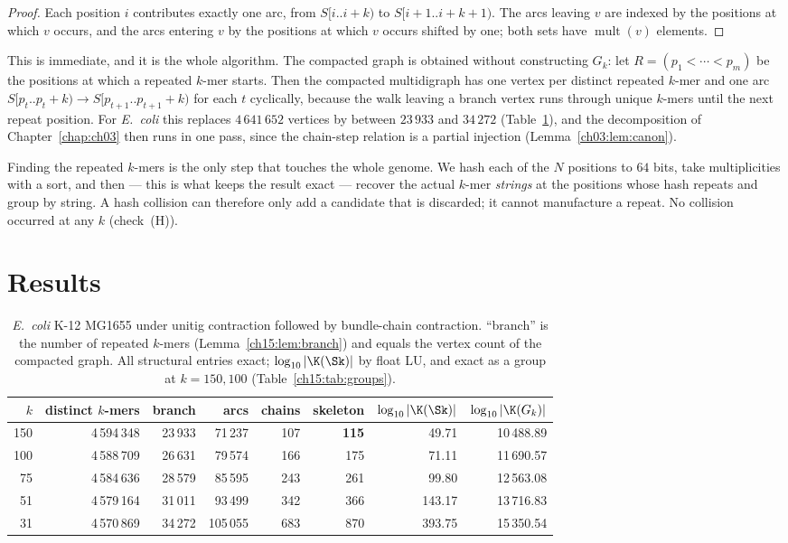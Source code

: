 \begin{proof}
Each position $i$ contributes exactly one arc, from $S[i..i{+}k)$ to $S[i{+}1..i{+}k{+}1)$.
The arcs leaving $v$ are indexed by the positions at which $v$ occurs, and the arcs
entering $v$ by the positions at which $v$ occurs shifted by one; both sets have
$\operatorname{mult}(v)$ elements.
\end{proof}

This is immediate, and it is the whole algorithm. The compacted graph is obtained without
constructing $G_k$: let $R=(p_1<\cdots<p_m)$ be the positions at which a repeated $k$-mer
starts. Then the compacted multidigraph has one vertex per distinct repeated $k$-mer and
one arc $S[p_t..p_t{+}k)\to S[p_{t+1}..p_{t+1}{+}k)$ for each $t$ cyclically, because the
walk leaving a branch vertex runs through unique $k$-mers until the next repeat position.
For \emph{E.\ coli} this replaces $4\,641\,652$ vertices by between $23\,933$ and
$34\,272$ (Table~\ref{ch15:tab:main}), and the decomposition of Chapter~\ref{chap:ch03} then runs in one
pass, since the chain-step relation is a partial injection (Lemma~\ref{ch03:lem:canon}).

Finding the repeated $k$-mers is the only step that touches the whole genome. We hash
each of the $N$ positions to $64$ bits, take multiplicities with a sort, and then --- this
is what keeps the result exact --- recover the actual $k$-mer \emph{strings} at the
positions whose hash repeats and group by string. A hash collision can therefore only
add a candidate that is discarded; it cannot manufacture a repeat. No collision occurred
at any $k$ (check~(H)).

\section{Results}\label{ch15:sec:results}

\begin{table}[ht]
\centering\footnotesize
\begin{tabular}{rrrrrrrr}
\toprule
$k$ & distinct $k$-mers & branch & arcs & chains & skeleton
& $\log_{10}|\K(\Sk)|$ & $\log_{10}|\K(G_k)|$\\
\midrule
150 & 4\,594\,348 & 23\,933 & 71\,237 & 107 & \textbf{115} & 49.71 & 10\,488.89\\
100 & 4\,588\,709 & 26\,631 & 79\,574 & 166 & 175 & 71.11 & 11\,690.57\\
 75 & 4\,584\,636 & 28\,579 & 85\,595 & 243 & 261 & 99.80 & 12\,563.08\\
 51 & 4\,579\,164 & 31\,011 & 93\,499 & 342 & 366 & 143.17 & 13\,716.83\\
 31 & 4\,570\,869 & 34\,272 & 105\,055 & 683 & 870 & 393.75 & 15\,350.54\\
\bottomrule
\end{tabular}
\caption{\emph{E.\ coli} K-12 MG1655 under unitig contraction followed by bundle-chain
contraction. ``branch'' is the number of repeated $k$-mers (Lemma~\ref{ch15:lem:branch}) and
equals the vertex count of the compacted graph. All structural entries exact;
$\log_{10}|\K(\Sk)|$ by float LU, and exact as a group at $k=150,100$
(Table~\ref{ch15:tab:groups}).}
\label{ch15:tab:main}
\end{table}

